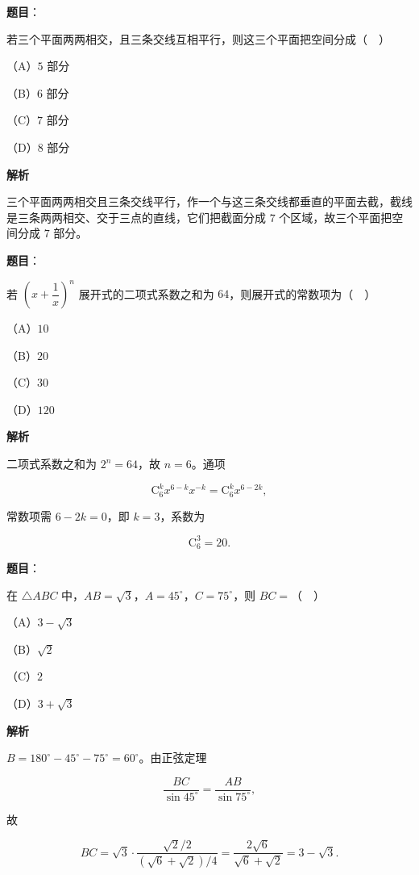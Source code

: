 \begin{answer}

\textbf{题目}：

若三个平面两两相交，且三条交线互相平行，则这三个平面把空间分成（　）

（A）$5$ 部分

（B）$6$ 部分

（C）$7$ 部分

（D）$8$ 部分

\textbf{解析}

三个平面两两相交且三条交线平行，作一个与这三条交线都垂直的平面去截，截线是三条两两相交、交于三点的直线，它们把截面分成 $7$ 个区域，故三个平面把空间分成 $7$ 部分。


\end{answer}
\begin{answer}

\textbf{题目}：

若 $\left(x+\dfrac1x\right)^n$ 展开式的二项式系数之和为 $64$，则展开式的常数项为（　）

（A）$10$

（B）$20$

（C）$30$

（D）$120$

\textbf{解析}

二项式系数之和为 $2^n=64$，故 $n=6$。通项

\nopagebreak[4]
\[\mathrm C_6^k x^{6-k}x^{-k}=\mathrm C_6^k x^{6-2k},\]

常数项需 $6-2k=0$，即 $k=3$，系数为

\nopagebreak[4]
\[\mathrm C_6^3=20.\]


\end{answer}
\begin{answer}

\textbf{题目}：

在 $\triangle ABC$ 中，$AB=\sqrt3$，$A=45^\circ$，$C=75^\circ$，则 $BC=$（　）

（A）$3-\sqrt3$

（B）$\sqrt2$

（C）$2$

（D）$3+\sqrt3$

\textbf{解析}

$B=180^\circ-45^\circ-75^\circ=60^\circ$。由正弦定理

\nopagebreak[4]
\[\frac{BC}{\sin45^\circ}=\frac{AB}{\sin75^\circ},\]

故

\nopagebreak[4]
\[BC=\sqrt3\cdot\frac{\sqrt2/2}{(\sqrt6+\sqrt2)/4}=\frac{2\sqrt6}{\sqrt6+\sqrt2}=3-\sqrt3.\]


\end{answer}
